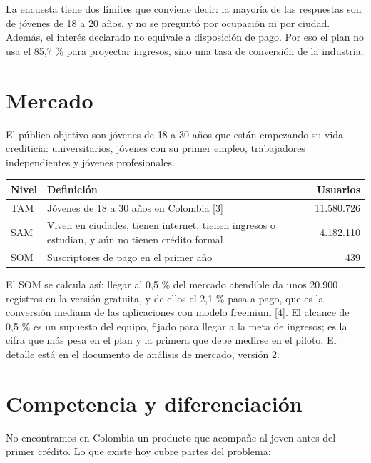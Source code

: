 \documentclass[11pt,a4paper]{article}
\begin{document}
La encuesta tiene dos límites que conviene decir: la mayoría de las respuestas son de jóvenes de 18 a 20 años, y no se preguntó por ocupación ni por ciudad. Además, el interés declarado no equivale a disposición de pago. Por eso el plan no usa el 85,7 \% para proyectar ingresos, sino una tasa de conversión de la industria.

\section{Mercado}

El público objetivo son jóvenes de 18 a 30 años que están empezando su vida crediticia: universitarios, jóvenes con su primer empleo, trabajadores independientes y jóvenes profesionales.

\begin{tabularx}{\textwidth}{l X r}
  \toprule
  \textbf{Nivel} & \textbf{Definición} & \textbf{Usuarios} \\
  \midrule
  TAM & Jóvenes de 18 a 30 años en Colombia [3] & 11.580.726 \\
  SAM & Viven en ciudades, tienen internet, tienen ingresos o estudian, y aún no tienen crédito formal & 4.182.110 \\
  SOM & Suscriptores de pago en el primer año & 439 \\
  \bottomrule
\end{tabularx}

El SOM se calcula así: llegar al 0,5 \% del mercado atendible da unos 20.900 registros en la versión gratuita, y de ellos el 2,1 \% pasa a pago, que es la conversión mediana de las aplicaciones con modelo freemium [4]. El alcance de 0,5 \% es un supuesto del equipo, fijado para llegar a la meta de ingresos; es la cifra que más pesa en el plan y la primera que debe medirse en el piloto. El detalle está en el documento de análisis de mercado, versión 2.

\newpage
\section{Competencia y diferenciación}

No encontramos en Colombia un producto que acompañe al joven antes del primer crédito. Lo que existe hoy cubre partes del problema:
\end{document}
